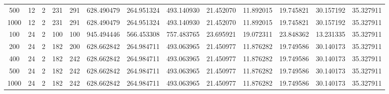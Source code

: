 \begin{table}[h]
\begin{tabular}{ccccccccccccc}
500 & 12 & 2 & 231 & 291 & 628.490479 & 264.951324 & 493.140930 & 21.452070 & 11.892015 & 19.745821 & 30.157192 & 35.327911 \\
1000 & 12 & 2 & 231 & 291 & 628.490479 & 264.951324 & 493.140930 & 21.452070 & 11.892015 & 19.745821 & 30.157192 & 35.327911 \\
100 & 24 & 2 & 100 & 100 & 945.494446 & 566.453308 & 757.483765 & 23.695921 & 19.072311 & 23.848362 & 13.231335 & 35.327911 \\
200 & 24 & 2 & 182 & 200 & 628.662842 & 264.984711 & 493.063965 & 21.450977 & 11.876282 & 19.749586 & 30.140173 & 35.327911 \\
400 & 24 & 2 & 182 & 242 & 628.662842 & 264.984711 & 493.063965 & 21.450977 & 11.876282 & 19.749586 & 30.140173 & 35.327911 \\
500 & 24 & 2 & 182 & 242 & 628.662842 & 264.984711 & 493.063965 & 21.450977 & 11.876282 & 19.749586 & 30.140173 & 35.327911 \\
1000 & 24 & 2 & 182 & 242 & 628.662842 & 264.984711 & 493.063965 & 21.450977 & 11.876282 & 19.749586 & 30.140173 & 35.327911 \\
\bottomrule
\end{tabular}
\end{table}
